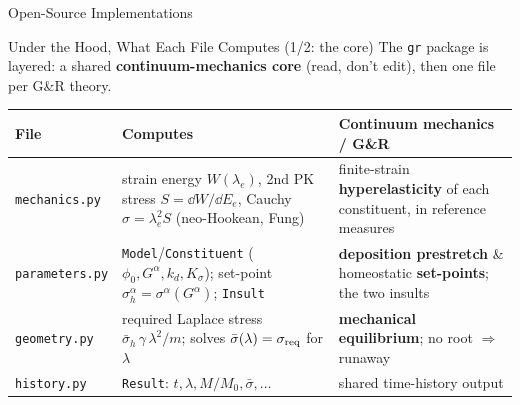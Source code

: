 \begin{frame}[t]{}
  \vfill\begin{center}{\Huge\color{YaleBlue} Open-Source Implementations}
  \end{center}\vfill
\end{frame}

\begin{frame}[t]{Under the Hood, What Each File Computes (1/2: the core)}
  \footnotesize
  The \texttt{gr} package is layered: a shared \textbf{continuum-mechanics core}
  (read, don't edit), then one file per G\&R theory.
  \vspace{0.2em}
  \renewcommand{\arraystretch}{1.4}
  \begin{tabular}{@{}p{}p{}p{}@{}}
    \toprule
    \textbf{File} & \textbf{Computes} & \textbf{Continuum mechanics / G\&R} \\
    \midrule
    \texttt{mechanics.py} & strain energy $W(\lambda_e)$, 2nd PK stress
      $S=\dd W/\dd E_e$, Cauchy $\sigma=\lambda_e^2 S$ (neo-Hookean, Fung) &
      finite-strain \textbf{hyperelasticity} of each constituent, in reference
      measures \\
    \texttt{parameters.py} & \texttt{Model}/\texttt{Constituent}
      ($\phi_0,G^{\alpha},k_d,K_\sigma$); set-point
      $\sigma_h^{\alpha}=\sigma^{\alpha}(G^{\alpha})$; \texttt{Insult} &
      \textbf{deposition prestretch} \& homeostatic \textbf{set-points}; the two
      insults \\
    \texttt{geometry.py} & required Laplace stress
      $\bar\sigma_h\,\gamma\,\lambda^2/m$; solves
      $\bar\sigma(\lambda)=\sigma_{\rm req}$ for $\lambda$ &
      \textbf{mechanical equilibrium}; no root $\Rightarrow$ runaway \\
    \texttt{history.py} & \texttt{Result}: $t,\lambda,M/M_0,\bar\sigma,\dots$ &
      shared time-history output \\
    \bottomrule
  \end{tabular}
\end{frame}

